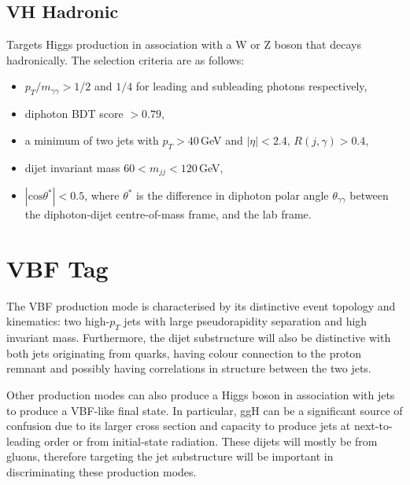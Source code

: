 \subsection{VH Hadronic}
Targets Higgs production in association with a W or Z boson that decays hadronically. The selection criteria are as follows:
\begin{itemize}[leftmargin=.5in,noitemsep]
    \item $p_{T}/m_{\gamma\gamma} > 1/2$ and $1/4$ for leading and subleading photons respectively, 
    \item diphoton BDT score $> 0.79$,
    \item a minimum of two jets with $p_T > 40$\,GeV and $|\eta| < 2.4$, $R(j,\gamma) > 0.4$,
    \item dijet invariant mass $60 < m_{jj} < 120$\,GeV,
    \item $|\mathrm{cos}{\theta^{*}}| < 0.5$, where $\theta^{*}$ is the difference in diphoton polar angle $\theta_{\gamma\gamma}$ between the diphoton-dijet centre-of-mass frame, and the lab frame.  
\end{itemize}













\section{VBF Tag}
The VBF production mode is characterised by its distinctive event topology and kinematics: two high-$p_{T}$ jets with large pseudorapidity separation and high invariant mass. Furthermore, the dijet substructure will also be distinctive with both jets originating from quarks, having colour connection to the proton remnant and possibly having correlations in structure between the two jets. 

Other production modes can also produce a Higgs boson in association with jets to produce a VBF-like final state. 
In particular, ggH can be a significant source of confusion due to its larger cross section and capacity to produce jets at next-to-leading order or from initial-state radiation. 
These dijets will mostly be from gluons, therefore targeting the jet substructure will be important in discriminating these production modes. 


